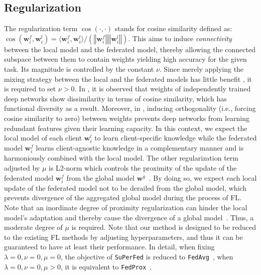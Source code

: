 \documentclass[sigconf]{acmart}
\begin{document}
\subsection{Regularization}
The regularization term $\cos(\cdot,\cdot)$ stands for cosine similarity defined as:  $\cos(\mathbf{w}^{f}_{i}, \mathbf{w}^{l}_{i}) = {\langle\mathbf{w}^{f}_{i}, \mathbf{w}^{l}_{i}\rangle} / ({\left\Vert\mathbf{w}^{f}_{i}\right\Vert\left\Vert\mathbf{w}^{l}_{i}\right\Vert})$. This aims to induce \textit{connectivity} between the local model and the federated model, thereby allowing the connected subspace between them to contain weights yielding high accuracy for the given task. Its magnitude is controlled by the constant $\nu$. Since merely applying the mixing strategy between the local and the federated models has little benefit \cite{nnsubspaces}, it is required to set $\nu>0$. In \cite{fort2019deep, nnsubspaces}, it is observed that weights of independently trained deep networks show dissimilarity in terms of cosine similarity, which has functional diversity as a result. Moreover, in \cite{ortho2,ortho3}, inducing orthogonality (i.e., forcing cosine similarity to zero) between weights prevents deep networks from learning redundant features given their learning capacity. In this context, we expect the local model of each client $\mathbf{w}^{l}_{i}$ to learn client-specific knowledge while the federated model $\mathbf{w}^{f}_{i}$ learns client-agnostic knowledge in a complementary manner and is harmoniously combined with the local model. 
The other regularization term adjusted by $\mu$ is L2-norm which controls the proximity of the update of the federated model $\mathbf{w}^{f}_{i}$ from the global model $\mathbf{w}^{g}$~\cite{fedprox}. By doing so, we expect each local update of the federated model not to be derailed from the global model, which prevents divergence of the aggregated global model during the process of FL. Note that an inordinate degree of proximity regularization can hinder the local model's adaptation and thereby cause the divergence of a global model~\cite{fedprox, pfedme}. Thus, a moderate degree of $\mu$ is required. 
Note that our method is designed to be reduced to the existing FL methods by adjusting hyperparameters, and thus it can be guaranteed to have at least their performance. In detail, when fixing $\lambda=0, \nu=0, \mu=0$, the objective of \texttt{SuPerFed} is reduced to \texttt{FedAvg}~\cite{mc+17}, when $\lambda=0, \nu=0, \mu>0$, it is equivalent to \texttt{FedProx}~\cite{fedprox}.
\end{document}
